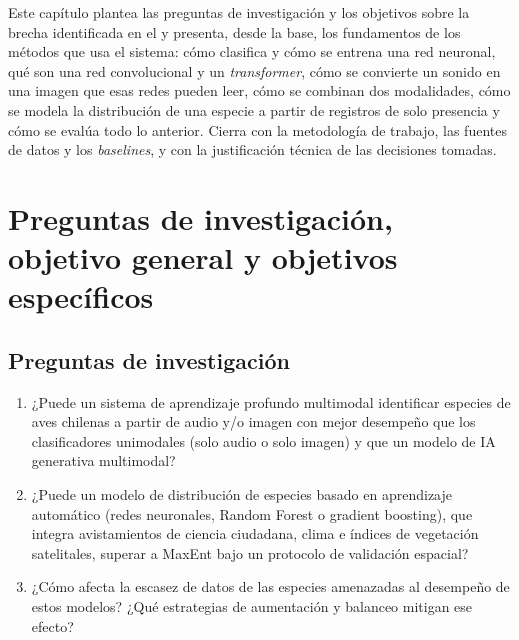 
Este capítulo plantea las preguntas de investigación y los objetivos sobre
la brecha identificada en el  y presenta, desde la
base, los fundamentos de los métodos que usa el sistema: cómo clasifica y
cómo se entrena una red neuronal, qué son una red convolucional y un
\textit{transformer}, cómo se convierte un sonido en una imagen que esas
redes pueden leer, cómo se combinan dos modalidades, cómo se modela la
distribución de una especie a partir de registros de solo presencia y cómo
se evalúa todo lo anterior. Cierra con la metodología de trabajo, las
fuentes de datos y los \textit{baselines}, y con la justificación técnica de
las decisiones tomadas.

\section{Preguntas de investigación, objetivo general y objetivos específicos}
\label{sec:objetivos}

\subsection*{Preguntas de investigación}

\begin{enumerate}[label=\textbf{PI\arabic*.}, leftmargin=*, itemsep=3pt]
  \item ¿Puede un sistema de aprendizaje profundo multimodal identificar
        especies de aves chilenas a partir de audio y/o imagen con mejor
        desempeño que los clasificadores unimodales (solo audio o solo
        imagen) y que un modelo de IA generativa multimodal?
  \item ¿Puede un modelo de distribución de especies basado en aprendizaje
        automático (redes neuronales, Random Forest o gradient boosting), que integra
        avistamientos de ciencia ciudadana, clima e índices de vegetación
        satelitales, superar a MaxEnt bajo un protocolo de validación
        espacial?
  \item ¿Cómo afecta la escasez de datos de las especies amenazadas al
        desempeño de estos modelos? ¿Qué estrategias de aumentación y
        balanceo mitigan ese efecto?
\end{enumerate}


